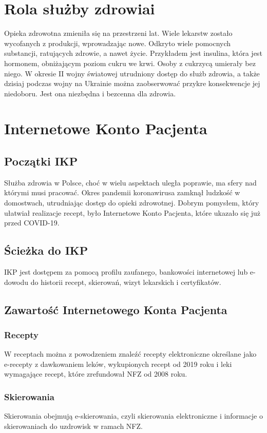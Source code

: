 \documentclass[11pt,a4paper]{article}
\begin{document}
\section{Rola służby zdrowiai}
Opieka zdrowotna zmieniła się na przestrzeni lat. Wiele lekarstw zostało wycofanych z produkcji, wprowadzając nowe. Odkryto wiele pomocnych substancji, ratujących zdrowie, a nawet życie. Przykładem jest insulina, która jest hormonem, obniżającym poziom cukru we krwi. Osoby z cukrzycą umierały bez niego. W okresie II wojny światowej utrudniony dostęp do służb zdrowia, a także dzisiaj podczas wojny na Ukrainie można zaobserwować przykre konsekwencje jej niedoboru. Jest ona niezbędna i bezcenna dla zdrowia.

\section{Internetowe Konto Pacjenta}
\subsection{Początki IKP}
Służba zdrowia w Polsce, choć w wielu aspektach uległa poprawie, ma sfery nad którymi musi pracować. Okres pandemii koronawirusa zamknął ludzkość w domostwach, utrudniając dostęp do opieki zdrowotnej. Dobrym pomysłem, który ułatwiał realizacje recept, było Internetowe Konto Pacjenta, które ukazało się już przed COVID-19.

\subsection{Ścieżka do IKP}
IKP jest dostępem za pomocą profilu zaufanego, bankowości internetowej lub e-dowodu do historii recept, skierowań, wizyt lekarskich i certyfikatów.

\subsection{Zawartość Internetowego Konta Pacjenta}
\subsubsection{Recepty}
W receptach można z powodzeniem znaleźć recepty elektroniczne określane jako e-recepty z dawkowaniem leków, wykupionych recept od 2019 roku i leki wymagające recept, które zrefundował NFZ od 2008 roku.

\subsubsection{Skierowania}
Skierowania obejmują e-skierowania, czyli skierowania elektroniczne i informacje o skierowaniach do uzdrowisk w ramach NFZ.
\end{document}
